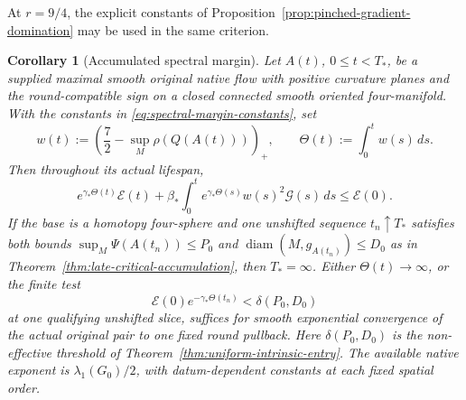\documentclass[11pt]{article}
\numberwithin{equation}{section}
\newtheorem{corollary}[theorem]{Corollary}
\theoremstyle{definition}
\theoremstyle{remark}
\begin{document}
At $r=9/4$, the explicit constants of
Proposition~\ref{prop:pinched-gradient-domination} may be used
in the same criterion.

\begin{corollary}[Accumulated spectral margin]
\label{cor:accumulated-spectral-margin}
Let $A(t)$, $0\le t<T_*$, be a supplied maximal smooth
original native flow with positive curvature planes and the
round-compatible sign on a closed connected smooth oriented
four-manifold. With the constants in
\eqref{eq:spectral-margin-constants}, set
\[
 w(t):=\left(\frac72-\sup_M\rho(Q(A(t)))\right)_+,
 \qquad \Theta(t):=\int_0^t w(s)\,ds.
\]
Then throughout its actual lifespan,
\begin{equation}\label{eq:accumulated-margin-energy}
 e^{\gamma_*\Theta(t)}\mathscr E(t)
 +\beta_*\int_0^t e^{\gamma_*\Theta(s)}w(s)^2
                  \mathscr G(s)\,ds\le\mathscr E(0).
\end{equation}
If the base is a homotopy four-sphere and one unshifted
sequence $t_n\uparrow T_*$ satisfies both bounds
$\sup_M\Psi(A(t_n))\le P_0$ and
$\operatorname{diam}(M,g_{A(t_n)})\le D_0$ as in
Theorem~\ref{thm:late-critical-accumulation}, then
$T_*=\infty$. Either $\Theta(t)\to\infty$, or the finite test
\begin{equation}\label{eq:finite-margin-entry-test}
 \mathscr E(0)e^{-\gamma_*\Theta(t_n)}<\delta(P_0,D_0)
\end{equation}
at one qualifying unshifted slice, suffices for smooth
exponential convergence of the actual original pair to one
fixed round pullback. Here $\delta(P_0,D_0)$ is the
non-effective threshold of Theorem~\ref{thm:uniform-intrinsic-entry}.
The available native exponent is
$\lambda_1(G_0)/2$, with datum-dependent constants at each
fixed spatial order.
\end{corollary}
\end{document}
